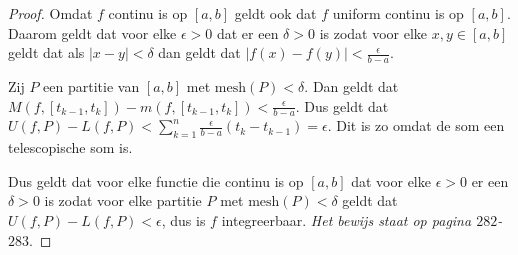 \label{sec:AG}

\begin{proof}
  Omdat $f$ continu is op $[a,b]$ geldt ook dat $f$ uniform continu is op $[a,b]$. Daarom geldt dat voor elke $\epsilon>0$ dat er een $\delta>0$ is zodat voor elke $x,y\in[a,b]$ geldt dat als $|x-y|<\delta$ dan geldt dat $|f(x)-f(y)|<\frac{\epsilon}{b-a}$. \medskip

  \noindent Zij $P$ een partitie van $[a,b]$ met $\text{mesh}(P)<\delta$. Dan geldt dat $M(f,[t_{k-1},t_{k}])-m(f,[t_{k-1},t_{k}])<\frac{\epsilon}{b-a}$. Dus geldt dat $U(f,P)-L(f,P)<\sum\limits_{k=1}^{n}\frac{\epsilon}{b-a}(t_{k}-t_{k-1})=\epsilon$. Dit is zo omdat de som een telescopische som is. \medskip

  \noindent Dus geldt dat voor elke functie die continu is op $[a,b]$ dat voor elke $\epsilon>0$ er een $\delta>0$ is zodat voor elke partitie $P$ met $\text{mesh}(P)<\delta$ geldt dat $U(f,P)-L(f,P)<\epsilon$, dus is $f$ integreerbaar. \textit{Het bewijs staat op pagina $282$-$283$}.
\end{proof}
